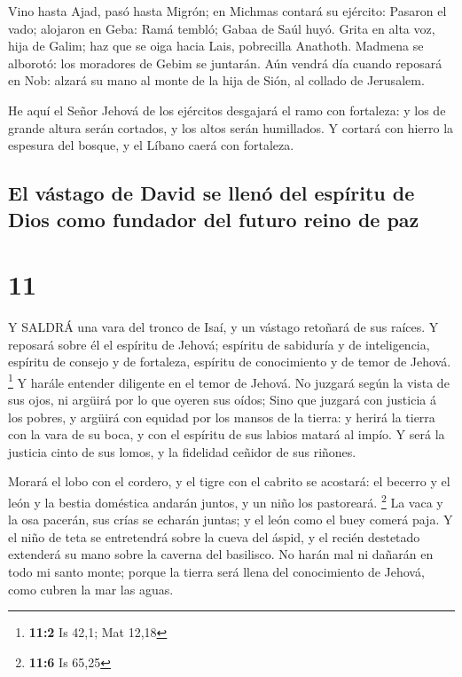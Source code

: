  Vino hasta Ajad, pasó hasta Migrón; en Michmas contará su
ejército:  Pasaron el vado; alojaron en Geba: Ramá tembló;
Gabaa de Saúl huyó.  Grita en alta voz, hija de Galim; haz
que se oiga hacia Lais, pobrecilla Anathoth.  Madmena se
alborotó: los moradores de Gebim se juntarán.  Aún vendrá
día cuando reposará en Nob: alzará su mano al monte de la hija de Sión,
al collado de Jerusalem.

 He aquí el Señor Jehová de los ejércitos desgajará el ramo
con fortaleza: y los de grande altura serán cortados, y los altos serán
humillados.  Y cortará con hierro la espesura del bosque, y
el Líbano caerá con fortaleza.

\hypertarget{el-vuxe1stago-de-david-se-llenuxf3-del-espuxedritu-de-dios-como-fundador-del-futuro-reino-de-paz}{%
\subsection{El vástago de David se llenó del espíritu de Dios como
fundador del futuro reino de
paz}\label{el-vuxe1stago-de-david-se-llenuxf3-del-espuxedritu-de-dios-como-fundador-del-futuro-reino-de-paz}}

\hypertarget{section-10}{%
\section{11}\label{section-10}}

 Y SALDRÁ una vara del tronco de Isaí, y un vástago retoñará
de sus raíces.  Y reposará sobre él el espíritu de Jehová;
espíritu de sabiduría y de inteligencia, espíritu de consejo y de
fortaleza, espíritu de conocimiento y de temor de Jehová. \footnote{\textbf{11:2}
  Is 42,1; Mat 12,18}  Y harále entender diligente en el
temor de Jehová. No juzgará según la vista de sus ojos, ni argüirá por
lo que oyeren sus oídos;  Sino que juzgará con justicia á
los pobres, y argüirá con equidad por los mansos de la tierra: y herirá
la tierra con la vara de su boca, y con el espíritu de sus labios matará
al impío.  Y será la justicia cinto de sus lomos, y la
fidelidad ceñidor de sus riñones.

 Morará el lobo con el cordero, y el tigre con el cabrito se
acostará: el becerro y el león y la bestia doméstica andarán juntos, y
un niño los pastoreará. \footnote{\textbf{11:6} Is 65,25} 
La vaca y la osa pacerán, sus crías se echarán juntas; y el león como el
buey comerá paja.  Y el niño de teta se entretendrá sobre la
cueva del áspid, y el recién destetado extenderá su mano sobre la
caverna del basilisco.  No harán mal ni dañarán en todo mi
santo monte; porque la tierra será llena del conocimiento de Jehová,
como cubren la mar las aguas.


